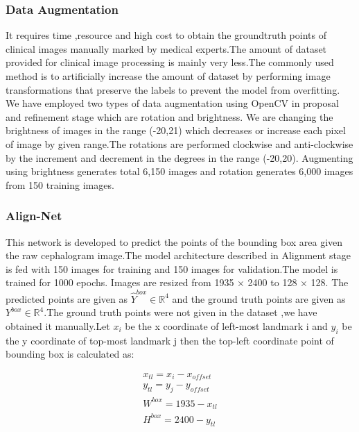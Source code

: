 \documentclass[sn-mathphys]{sn-jnl}%
\theoremstyle{thmstyleone}%
\theoremstyle{thmstyletwo}%
\theoremstyle{thmstylethree}%
\begin{document}
\subsubsection{Data Augmentation}
It requires time ,resource and high cost to obtain the groundtruth points of clinical images manually marked by medical experts.The amount of dataset provided for clinical image processing  is mainly very less.The commonly used method is to artificially increase the amount of dataset by performing image transformations that preserve the labels to prevent the model from overfitting. We have employed two types of data augmentation  using OpenCV in proposal and refinement stage which are rotation and brightness. We are changing the brightness of images in the range (-20,21) which decreases or increase each pixel of image by given range.The rotations are performed clockwise and anti-clockwise by the increment and decrement in the degrees in the range (-20,20). Augmenting using brightness generates total 6,150 images and rotation generates 6,000 images from 150 training images.


 \subsubsection{Align-Net}
This network is developed to predict the points of the bounding box  area given the raw cephalogram image.The model architecture described in Alignment stage is fed with 150 images for training and 150 images for validation.The model is trained for 1000 epochs. Images are resized from 1935 × 2400 to 128 × 128. The predicted points are given as \begin{math} \hat{Y}^{box} \in \mathbb{R}^{4} \end{math} and the ground truth points are given as \begin{math} Y^{box} \in \mathbb{R}^{4} \end{math}.The ground truth points were not given in the dataset ,we have obtained it manually.Let \begin{math} x_{i} \end{math} be the x coordinate of left-most landmark i and \begin{math} y_{i} \end{math} be the y coordinate of top-most landmark j then the top-left coordinate point of bounding box is calculated as:

\begin{align*}
    x_{tl} = x_{i} - x_{offset}  \\
    y_{tl} = y_{j} - y_{offset}  \\
    W^{box} = 1935 - x_{tl}  \\
    H^{box} = 2400 - y_{tl}  
\end{align*}
   
\end{document}
